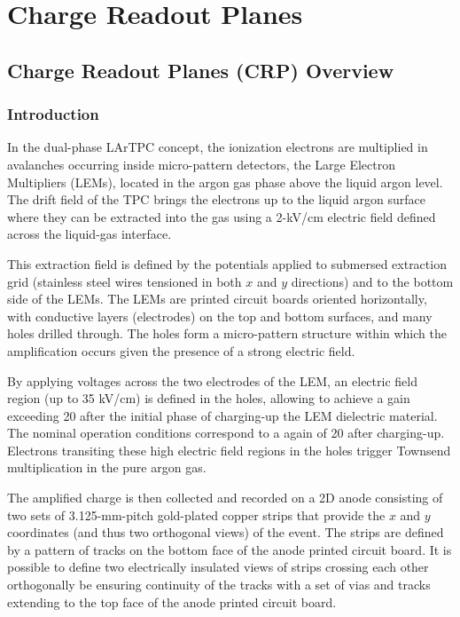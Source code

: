 \chapter{Charge Readout Planes}
\label{ch:fddp-CRP}

\section{Charge Readout Planes (CRP) Overview}
\label{sec:fddp-crp-ov}


\subsection{Introduction}
\label{sec:fddp-crp-intro}

In the dual-phase LArTPC concept, the ionization electrons are multiplied in avalanches  occurring inside micro-pattern detectors, the Large Electron Multipliers (LEMs), located in the argon gas  phase above the liquid argon level. The drift field of the TPC brings the electrons up to the liquid argon surface where they can  be    extracted into the gas using a 2-kV/cm electric field defined across the liquid-gas interface.

This extraction field is defined by the potentials applied to submersed extraction grid (stainless steel wires tensioned in both $x$ and $y$ directions) and to the bottom side of the LEMs. The LEMs are printed circuit boards oriented horizontally, with conductive layers (electrodes) on the top and bottom surfaces, and many holes drilled through.  The holes form a micro-pattern structure within which the amplification occurs given the presence of a strong electric field.

By applying voltages across the two electrodes of the LEM, an electric field region (up to 35 kV/cm) is defined in the holes, allowing to achieve a gain exceeding 20 after the initial phase of  charging-up the LEM dielectric material. The nominal operation conditions correspond to a again of 20 after charging-up. Electrons transiting these high electric field regions in the holes trigger Townsend multiplication in the pure argon gas.

The amplified charge is then collected and recorded on a 2D anode consisting of two sets of 3.125-mm-pitch gold-plated copper strips that provide the $x$ and $y$ coordinates (and thus two orthogonal views) of the event. The strips are defined by a pattern of tracks on the bottom face of the anode printed circuit board. It is possible  to define two electrically insulated views of strips crossing each other orthogonally be ensuring continuity of the tracks with a set of vias and tracks extending to the top face of the anode printed circuit board.

